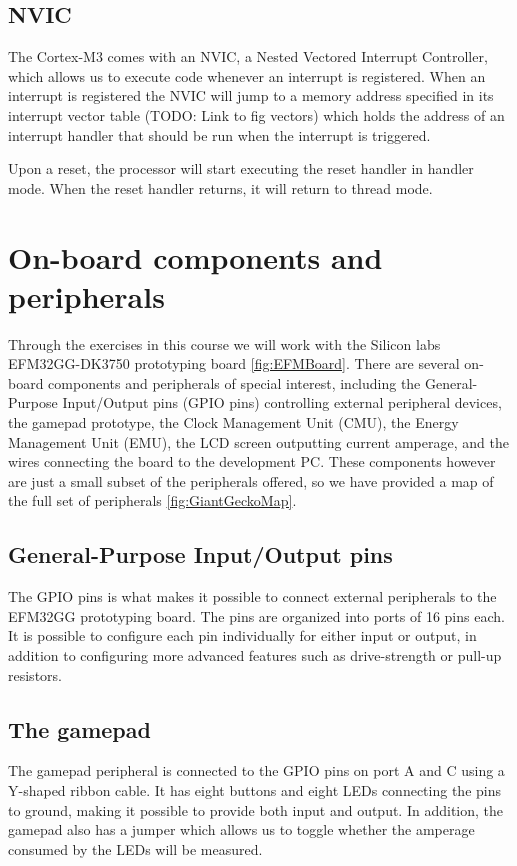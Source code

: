\subsection{NVIC}
The Cortex-M3 comes with an NVIC, a Nested Vectored Interrupt Controller, which allows us to execute code whenever an interrupt is registered. When an interrupt is registered the NVIC will jump to a memory address specified in its interrupt vector table (TODO: Link to fig vectors) which holds the address of an interrupt handler that should be run when the interrupt is triggered.\cite{compendium}

Upon a reset, the processor will start executing the reset handler in handler mode. When the reset handler returns, it will return to thread mode.

\section{On-board components and peripherals}

Through the exercises in this course we will work with the  Silicon labs EFM32GG-DK3750 prototyping board \ref{fig:EFMBoard}. There are several on-board components and peripherals of special interest, including the General-Purpose Input/Output pins (GPIO pins) controlling external peripheral devices, the gamepad prototype, the Clock Management Unit (CMU), the Energy Management Unit (EMU), the LCD screen outputting current amperage, and the wires connecting the board to the development PC. These components however are just a small subset of the peripherals offered, so we have provided a map of the full set of peripherals \ref{fig:GiantGeckoMap}.

\subsection{General-Purpose Input/Output pins}
The GPIO pins is what makes it possible to connect external peripherals to the EFM32GG prototyping board. The pins are organized into ports of 16 pins each. It is possible to configure each pin individually for either input or output, in addition to configuring more advanced features such as drive-strength or pull-up resistors.

\subsection{The gamepad}
The gamepad peripheral is connected to the GPIO pins on port A and C using a Y-shaped ribbon cable. It has eight buttons and eight LEDs connecting the pins to ground, making it possible to provide both input and output. In addition, the gamepad also has a jumper which allows us to toggle whether the amperage consumed by the LEDs will be measured.

